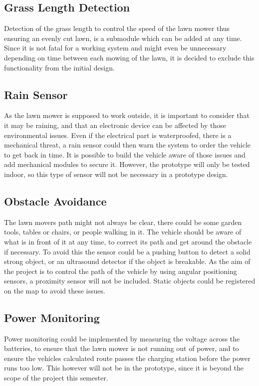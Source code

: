 \subsection{Grass Length Detection}
Detection of the grass length to control the speed of the lawn mower thus ensuring an evenly cut lawn, is a submodule which can be added at any time. Since it is not fatal for a working system and might even be unnecessary depending on time between each mowing of the lawn, it is decided to exclude this functionality from the initial design.

\subsection{Rain Sensor}
As the lawn mower is supposed to work outside, it is important to consider that it may be raining, and that an electronic device can be affected by those environmental issues. Even if the electrical part is waterproofed, there is a mechanical threat, a rain sensor could then warn the system to order the vehicle to get back in time.
It is possible to build the vehicle aware of those issues and add mechanical modules to secure it. However, the prototype will only be tested indoor, so this type of sensor will not be necessary in a prototype design.

\subsection{Obstacle Avoidance}
The lawn movers path might not always be clear, there could be some garden tools, tables or chairs, or people walking in it. The vehicle should be aware of what is in front of it at any time, to correct its path and get around the obstacle if necessary. To avoid this the sensor could be a pushing button to detect a solid strong object, or an ultrasound detector if the object is breakable.
As the aim of the project is to control the path of the vehicle by using angular positioning sensors, a proximity sensor will not be included. Static objects could be registered on the map to avoid these issues.

\subsection{Power Monitoring}
Power monitoring could be implemented by measuring the voltage across the batteries, to ensure that the lawn mower is not running out of power, and to ensure the vehicles calculated route passes the charging station before the power runs too low.
This however will not be in the prototype, since it is beyond the scope of the project this semester.

